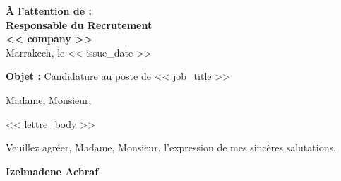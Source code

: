\documentclass[10pt,a4paper]{altacv}
\makeatletter
\renewcommand{\makecvheader}{%
  \begingroup
    \raggedright\color{emphasis}%
    {\Huge\bfseries\MakeUppercase{\@name}\par}
    \medskip
    {\large\bfseries\color{accent}\@tagline\par}
    \medskip
    {\footnotesize\bfseries\@personalinfo\par}
  \endgroup\medskip
}
\makeatother
\begin{document}

\makecvheader

\bigskip\medskip

\begin{flushright}
  {\color{emphasis}\textbf{À l'attention de :}} \\[2pt]
  \textbf{Responsable du Recrutement} \\
  \textbf{<< company >>} \\[20pt]
  Marrakech, le << issue_date >>
\end{flushright}
\bigskip\bigskip

{\color{accent}\textbf{Objet :}} Candidature au poste de << job_title >>

\bigskip\bigskip

Madame, Monsieur,

\vspace{0.4cm}

<< lettre_body >>

\vspace{0.4cm}

Veuillez agréer, Madame, Monsieur, l'expression de mes sincères salutations.

\vfill

\begin{flushright}
  \Large\color{emphasis}\textbf{Izelmadene Achraf}
\end{flushright}
\end{document}
